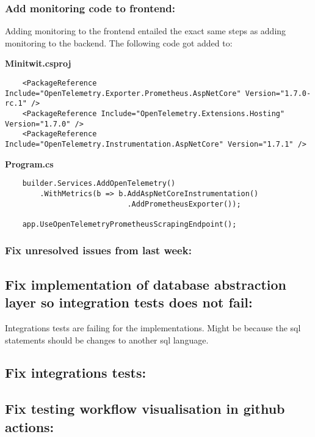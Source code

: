 \subsubsection{Add monitoring code to frontend:}
\label{log:add-monitoring-code-to-frontend}

Adding monitoring to the frontend entailed the exact same steps as
adding monitoring to the backend. The following code got added to:

\textbf{Minitwit.csproj}

\begin{verbatim}
    <PackageReference Include="OpenTelemetry.Exporter.Prometheus.AspNetCore" Version="1.7.0-rc.1" />
    <PackageReference Include="OpenTelemetry.Extensions.Hosting" Version="1.7.0" />
    <PackageReference Include="OpenTelemetry.Instrumentation.AspNetCore" Version="1.7.1" />
\end{verbatim}

\textbf{Program.cs}

\begin{verbatim}
    builder.Services.AddOpenTelemetry()
        .WithMetrics(b => b.AddAspNetCoreInstrumentation()
                            .AddPrometheusExporter());

    app.UseOpenTelemetryPrometheusScrapingEndpoint();
\end{verbatim}

\subsubsection{Fix unresolved issues from last week:}
\label{log:fix-unresolved-issues-from-last-week}

\subsection{Fix implementation of database abstraction layer so integration tests does not fail:}
\label{log:fix-implementation-of-database-abstraction-layer-so-integration-tests-does-not-fail}

Integrations tests are failing for the implementations. Might be because
the sql statements should be changes to another sql language.

\subsection{Fix integrations tests:}
\label{log:fix-integrations-tests}

\subsection{Fix testing workflow visualisation in github actions:}
\label{log:fix-testing-workflow-visualisation-in-github-actions}


